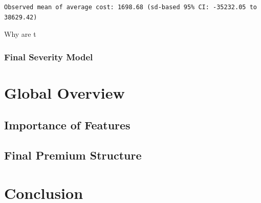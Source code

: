 \documentclass[
  english,
  11pt,
]{article}
\begin{document}
\begin{verbatim}
Observed mean of average cost: 1698.68 (sd-based 95% CI: -35232.05 to 38629.42)
\end{verbatim}

Why are t

\subsubsection{Final Severity Model}\label{final-severity-model}

\section{Global Overview}\label{global-overview}

\subsection{Importance of Features}\label{importance-of-features}

\subsection{Final Premium Structure}\label{final-premium-structure}

\section{Conclusion}\label{conclusion}
\end{document}

